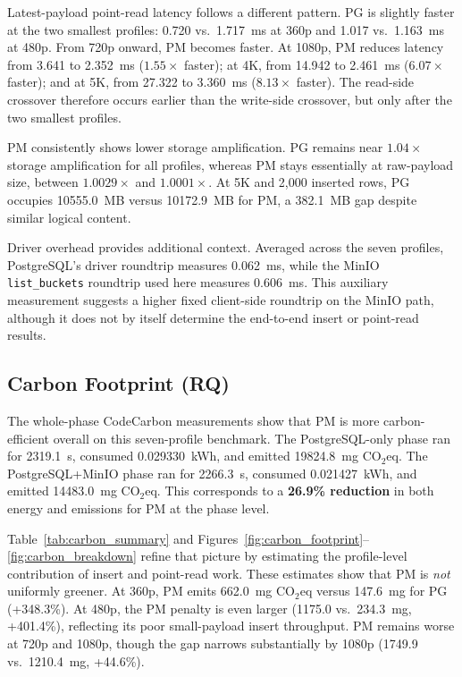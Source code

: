 \documentclass[conference]{IEEEtran}
\begin{document}
Latest-payload point-read latency follows a different pattern. PG is slightly faster at the two smallest profiles: 0.720 vs.\ 1.717~ms at 360p and 1.017 vs.\ 1.163~ms at 480p. From 720p onward, PM becomes faster. At 1080p, PM reduces latency from 3.641 to 2.352~ms ($1.55\times$ faster); at 4K, from 14.942 to 2.461~ms ($6.07\times$ faster); and at 5K, from 27.322 to 3.360~ms ($8.13\times$ faster). The read-side crossover therefore occurs earlier than the write-side crossover, but only after the two smallest profiles.

PM consistently shows lower storage amplification. PG remains near $1.04\times$ storage amplification for all profiles, whereas PM stays essentially at raw-payload size, between $1.0029\times$ and $1.0001\times$. At 5K and 2,000 inserted rows, PG occupies 10555.0~MB versus 10172.9~MB for PM, a 382.1~MB gap despite similar logical content.

Driver overhead provides additional context. Averaged across the seven profiles, PostgreSQL's driver roundtrip measures 0.062~ms, while the MinIO \texttt{list\_buckets} roundtrip used here measures 0.606~ms. This auxiliary measurement suggests a higher fixed client-side roundtrip on the MinIO path, although it does not by itself determine the end-to-end insert or point-read results.

\subsection{Carbon Footprint (RQ)}
\label{subsec:carbon_footprint}
The whole-phase CodeCarbon measurements show that PM is more carbon-efficient overall on this seven-profile benchmark. The PostgreSQL-only phase ran for 2319.1~s, consumed 0.029330~kWh, and emitted 19824.8~mg CO$_2$eq. The PostgreSQL+MinIO phase ran for 2266.3~s, consumed 0.021427~kWh, and emitted 14483.0~mg CO$_2$eq. This corresponds to a \textbf{26.9\% reduction} in both energy and emissions for PM at the phase level.

Table~\ref{tab:carbon_summary} and Figures~\ref{fig:carbon_footprint}--\ref{fig:carbon_breakdown} refine that picture by estimating the profile-level contribution of insert and point-read work. These estimates show that PM is \emph{not} uniformly greener. At 360p, PM emits 662.0~mg CO$_2$eq versus 147.6~mg for PG (+348.3\%). At 480p, the PM penalty is even larger (1175.0 vs.\ 234.3~mg, +401.4\%), reflecting its poor small-payload insert throughput. PM remains worse at 720p and 1080p, though the gap narrows substantially by 1080p (1749.9 vs.\ 1210.4~mg, +44.6\%).
\end{document}
